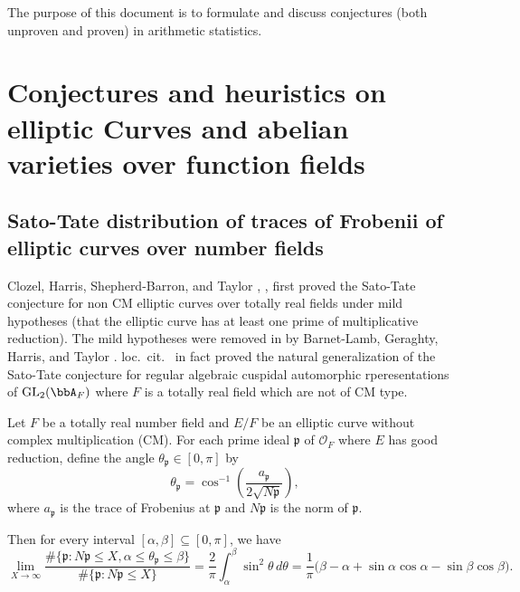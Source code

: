 


The purpose of this document is to formulate and discuss conjectures (both unproven and proven) in arithmetic statistics.
\section{Conjectures and heuristics on elliptic Curves and abelian varieties over function fields }

\subsection{Sato-Tate distribution of traces of Frobenii of elliptic curves over number fields}

Clozel, Harris, Shepherd-Barron, and Taylor \cite{clozel_harris_taylor_aselllamellr}, \cite{taylor_aselllamellrii}, \cite{harris_shepherd-barron_taylor_ilpa} first proved the Sato-Tate conjecture for non CM elliptic curves over totally real fields under mild hypotheses (that the elliptic curve has at least one prime of multiplicative reduction). The mild hypotheses were removed in by Barnet-Lamb, Geraghty, Harris, and Taylor \cite{barnet-lamb_geraghty_harris_taylor_fcyvpaii}. loc.~cit.~ in fact proved the natural generalization of the Sato-Tate conjecture for regular algebraic cuspidal automorphic rperesentations of $\mathrm{GL}_2(\bbA_F)$ where $F$ is a totally real field which are not of CM type.

\begin{theorem}
    Let \( F \) be a totally real number field and \( E/F \) be an elliptic curve without complex multiplication (CM). For each prime ideal \(\mathfrak{p}\) of \(\mathcal{O}_F\) where \( E \) has good reduction, define the angle \(\theta_\mathfrak{p} \in [0, \pi]\) by
    \[
    \theta_\mathfrak{p} = \cos^{-1}\left(\frac{a_\mathfrak{p}}{2 \sqrt{N\mathfrak{p}}}\right),
    \]
    where \( a_\mathfrak{p} \) is the trace of Frobenius at \(\mathfrak{p}\) and \( N\mathfrak{p} \) is the norm of \(\mathfrak{p}\).

    Then for every interval \([ \alpha, \beta ] \subseteq [0, \pi]\), we have
    \[
    \lim_{X \to \infty} \frac{\#\{\mathfrak{p} : N\mathfrak{p} \leq X, \alpha \leq \theta_\mathfrak{p} \leq \beta \}}{\#\{\mathfrak{p} : N\mathfrak{p} \leq X\}} 
    = \frac{2}{\pi} \int_\alpha^\beta \sin^2 \theta \, d\theta 
    = \frac{1}{\pi} \bigl( \beta - \alpha + \sin \alpha \cos \alpha - \sin \beta \cos \beta \bigr).
    \]
\end{theorem}


